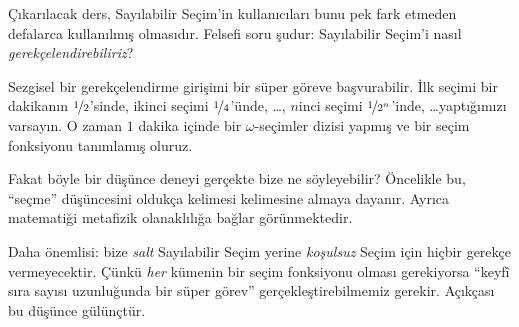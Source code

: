Çıkarılacak ders, Sayılabilir Seçim'in kullanıcıları bunu pek fark etmeden
defalarca kullanılmış olmasıdır. Felsefi soru şudur: Sayılabilir Seçim'i
nasıl \emph{gerekçelendirebiliriz}?

Sezgisel bir gerekçelendirme girişimi bir süper göreve başvurabilir. İlk
seçimi bir dakikanın $\nicefrac{1}{2}$'sinde, ikinci seçimi
$\nicefrac{1}{4}$'ünde, \dots, $n$inci seçimi
$\nicefrac{1}{2^n}$'inde, \dots\@ yaptığımızı varsayın. O zaman $1$ dakika
içinde bir $\omega$-seçimler dizisi yapmış ve bir seçim fonksiyonu
tanımlamış oluruz.

Fakat böyle bir düşünce deneyi gerçekte bize ne söyleyebilir? Öncelikle bu,
``seçme'' düşüncesini oldukça kelimesi kelimesine almaya dayanır. Ayrıca
matematiği metafizik olanaklılığa bağlar görünmektedir.

Daha önemlisi: bize \emph{salt} Sayılabilir Seçim yerine \emph{koşulsuz}
Seçim için hiçbir gerekçe vermeyecektir. Çünkü \emph{her} kümenin bir
seçim fonksiyonu olması gerekiyorsa ``keyfî sıra sayısı uzunluğunda bir
süper görev'' gerçekleştirebilmemiz gerekir. Açıkçası bu düşünce
gülünçtür.

